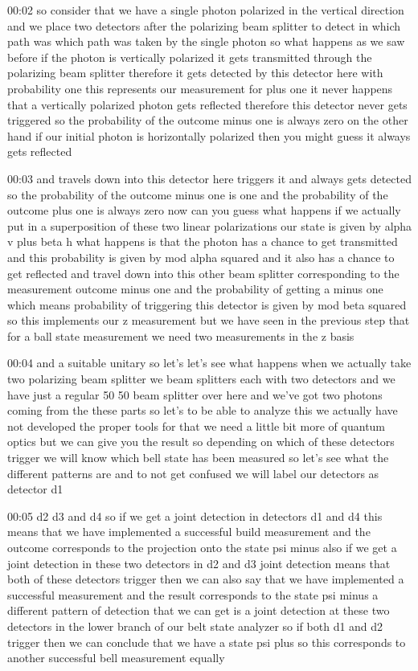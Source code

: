 00:02
so consider that we have a single photon polarized in the vertical direction
and we place two detectors after the polarizing beam splitter to detect in which
path was which path was taken by the single photon
so what happens as we saw before if the photon is vertically polarized
it gets transmitted through the polarizing beam splitter
therefore it gets detected by this detector here
with probability one this represents our measurement
for plus one it never happens that a vertically polarized photon gets
reflected therefore this detector never gets triggered so
the probability of the outcome minus one is always zero on the other hand
if our initial photon is horizontally polarized
then you might guess it always gets reflected

00:03
and travels down into this detector here triggers it and always gets detected so
the probability of the outcome minus one is one and the probability of
the outcome plus one is always zero now can you guess what happens if we
actually put in a superposition of these two linear polarizations our state
is given by alpha v plus beta h what happens is that the photon has a chance
to get transmitted and this probability is given by
mod alpha squared and it also has a chance to get reflected
and travel down into this other beam splitter corresponding to the
measurement outcome minus one and the probability of getting a minus one
which means probability of triggering this detector is given by mod beta squared
so this implements our z measurement but we have seen in the previous step that
for a ball state measurement we need two measurements in the z basis

00:04
and a suitable unitary so let's let's see what happens when we actually take
two polarizing beam splitter we beam splitters each with two detectors
and we have just a regular 50 50 beam splitter over here and we've
got two photons coming from the these parts
so let's to be able to analyze this we actually
have not developed the proper tools for that we need
a little bit more of quantum optics but we can give you the result so
depending on which of these detectors trigger we will know
which bell state has been measured so let's see what the different patterns
are and to not get confused we will label our detectors as detector d1

00:05
d2 d3 and d4 so if we get a joint detection in detectors d1 and d4
this means that we have implemented a successful build measurement
and the outcome corresponds to the projection onto the state psi minus also
if we get a joint detection in these two detectors
in d2 and d3 joint detection means that both of these detectors trigger
then we can also say that we have implemented a successful measurement
and the result corresponds to the state psi
minus a different pattern of detection that we can get
is a joint detection at these two detectors in the lower branch of our
belt state analyzer so if both d1 and d2 trigger
then we can conclude that we have a state psi plus so this corresponds to
another successful bell measurement equally

